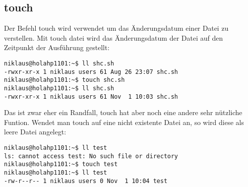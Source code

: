 \documentclass[10pt,paper=a4,final]{scrartcl}
\begin{document}
\subsection{touch}
Der Befehl touch wird verwendet um das \"Anderungsdatum einer Datei zu verstellen. Mit touch datei wird das \"Anderungsdatum der Datei auf den Zeitpunkt der Ausf\"uhrung gestellt:
\begin{lstlisting}[frame=single]
niklaus@holahp1101:~$ ll shc.sh 
-rwxr-xr-x 1 niklaus users 61 Aug 26 23:07 shc.sh
niklaus@holahp1101:~$ touch shc.sh 
niklaus@holahp1101:~$ ll shc.sh 
-rwxr-xr-x 1 niklaus users 61 Nov  1 10:03 shc.sh
\end{lstlisting}
Das ist zwar eher ein Randfall, touch hat aber noch eine andere sehr n\"utzliche Funtion. Wendet man touch auf eine nicht existente Datei an, so wird diese als leere Datei angelegt:
\begin{lstlisting}[frame=single]
niklaus@holahp1101:~$ ll test
ls: cannot access test: No such file or directory
niklaus@holahp1101:~$ touch test
niklaus@holahp1101:~$ ll test
-rw-r--r-- 1 niklaus users 0 Nov  1 10:04 test
\end{lstlisting}
\end{document}
